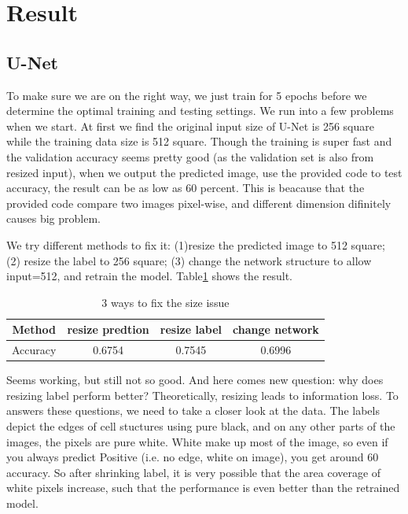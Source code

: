 \section{Result}
\subsection{U-Net}
To make sure we are on the right way, we just train for 5 epochs before we determine the optimal training and testing settings. We run into a few problems when we start. At first we find the original input size of U-Net is 256 square while the training data size is 512 square. Though the training is super fast and the validation accuracy seems pretty good (as the validation set is also from resized input), when we output the predicted image, use the provided code to test accuracy, the result can be as low as 60 percent. This is beacause that the provided code compare two images pixel-wise, and different dimension difinitely causes big problem. 

We try different methods to fix it: (1)resize the predicted image to 512 square; (2) resize the label to 256 square; (3) change the network structure to allow input=512, and retrain the model. Table\ref{tab:unetsize} shows the result.
\begin{table}[htpb]
    \centering
    \caption{3 ways to fix the size issue}\label{tab:unetsize}
    \begin{tabular}{c|c|c|c}
        \hline
        Method & resize predtion & resize label & change network \\
        \hline
        Accuracy & 0.6754 & 0.7545 & 0.6996 \\
        \hline
    \end{tabular}
\end{table} 

Seems working, but still not so good. And here comes new question: why does resizing label perform better? Theoretically, resizing leads to information loss. To answers these questions, we need to take a closer look at the data. The labels depict the edges of cell stuctures using pure black, and on any other parts of the images, the pixels are pure white. White make up most of the image, so even if you always predict Positive (i.e. no edge, white on image), you get around 60 accuracy. So after shrinking label, it is very possible that the area coverage of white pixels increase, such that the performance is even better than the retrained model.


